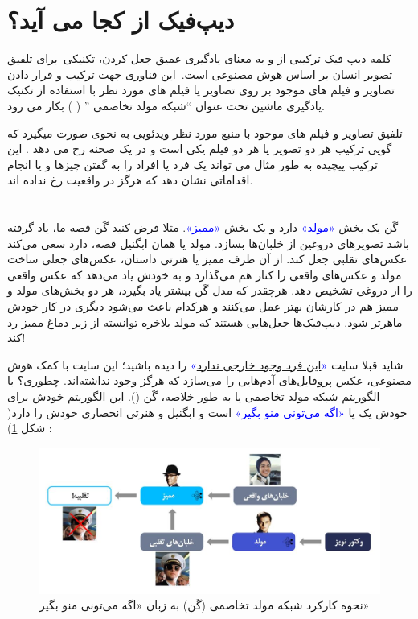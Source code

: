 \documentclass[12pt,a4paper]{report}
\begin{document}
\section{دیپ‌فیک از کجا می آید؟}
 	 کلمه دیپ فیک  ترکیبی از  و   به معنای یادگیری عمیق جعل کردن، تکنیکی برای تلفیق تصویر انسان بر اساس هوش مصنوعی است. این فناوری جهت ترکیب و قرار دادن تصاویر و فیلم های موجود بر روی تصاویر یا فیلم های مورد نظر با استفاده از تکنیک یادگیری ماشین تحت عنوان “شبکه مولد تخاصمی ” ( )  بکار می رود. 
 		
 		
 		تلفیق تصاویر و فیلم های موجود با منبع مورد نظر ویدئویی به نحوی صورت میگیرد که گویی ترکیب هر دو تصویر یا هر دو فیلم یکی است و در یک صحنه رخ می دهد . این ترکیب پیچیده به طور مثال می تواند یک فرد یا افراد را به گفتن چیزها و یا انجام اقداماتی نشان دهد که هرگز در واقعیت رخ نداده اند.\cite{asrIran}
 		
 		
\section{}
 	 
 		گَن یک بخش \textcolor{blue}{«مولد» } دارد و یک بخش \textcolor{blue}{«ممیز»}. مثلا فرض کنید گَن قصه ما، یاد گرفته باشد تصویرهای دروغین از خلبان‌ها بسازد. مولد یا همان ابگنیل قصه، دارد سعی می‌کند عکس‌های تقلبی جعل کند. از آن طرف ممیز یا هنرتی داستان، عکس‌های جعلی ساخت مولد و عکس‌های واقعی را کنار هم می‌گذارد و به خودش یاد می‌دهد که عکس واقعی را از دروغی تشخیص دهد. هرچقدر که مدل گَن بیشتر یاد بگیرد، هر دو بخش‌های مولد و ممیز هم در کارشان بهتر عمل می‌کنند و هرکدام باعث می‌شود دیگری در کار خودش ماهرتر شود. دیپ‌فیک‌ها جعل‌هایی هستند که مولد بلاخره توانسته از زیر دماغ ممیز رد کند! \cite{queraMag} 
 		
شاید قبلا سایت \textcolor{blue}{«\href{https://thispersondoesnotexist.com/}{این فرد وجود خارجی ندارد}»} را دیده باشید؛ این سایت با کمک هوش مصنوعی، عکس پروفایل‌های آدم‌‌هایی را می‌سازد که هرگز وجود نداشته‌اند. چطوری؟ با الگوریتم شبکه مولد تخاصمی  یا به طور خلاصه، گَن (). این الگوریتم خودش برای خودش یک پا \textcolor{blue}{«اگه می‌تونی منو بگیر» } است و ابگنیل و هنرتی انحصاری خودش را دارد( شکل \ref{ganDiagram}) : 		

\begin{figure}
	\includegraphics[width=1 \textwidth ]{images/gandiagram.jpeg}
	\caption{نحوه کارکرد شبکه مولد تخاصمی (گَن) به زبان «اگه می‌تونی منو بگیر»}
	\label{ganDiagram}
\end{figure}
\end{document}
